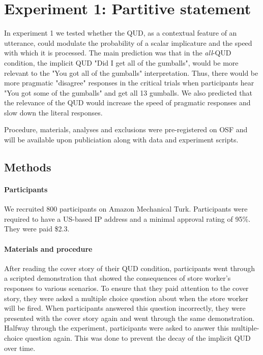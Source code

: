 \documentclass[10pt,letterpaper]{article}
\begin{document}
\section{Experiment 1: Partitive statement}

In experiment 1 we tested whether the QUD, as a contextual feature of an utterance, could modulate the probability of a scalar implicature and the speed with which it is processed. The main prediction was that in the \textit{all}-QUD condition, the implicit QUD "Did I get all of the gumballs", would be more relevant to the "You got all of the gumballs" interpretation. Thus, there would be more pragmatic "disagree" responses in the critical trials when participants hear "You got some of the gumballs" and get all 13 gumballs. We also predicted that the relevance of the QUD would increase the speed of pragmatic responses and slow down the literal responses.

Procedure, materials, analyses and exclusions were pre-registered on OSF and will be available upon publiciation along with data and experiment scripts.

\subsection{Methods}

\paragraph{Participants}
We recruited 800 participants on Amazon Mechanical Turk. Participants were required to have a US-based IP address and a minimal approval rating of 95\%. They were paid \$2.3.

\paragraph{Materials and procedure}
After reading the cover story of their QUD condition, participants went through a scripted demonstration that showed the consequences of store worker's responses to various scenarios. To ensure that they paid attention to the cover story, they were asked a multiple choice question about when the store worker will be fired. When participants answered this question incorrectly, they were presented with the cover story again and went through the same demonstration. Halfway through the experiment, participants were asked to answer this multiple-choice question again. This was done to prevent the decay of the implicit QUD over time.
\end{document}

